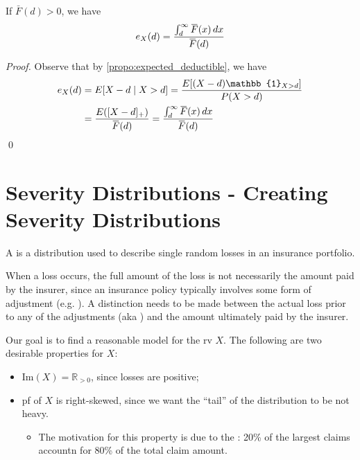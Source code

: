 \documentclass[notoc,notitlepage]{tufte-book}
\begin{document}
\begin{propo}
\label{propo:an_expression_for_mean_excess_value}
  If $\bar{F}(d) > 0$, we have
  \begin{equation*}
    e_X(d) = \frac{\int_{d}^{\infty} \bar{F}(x) \dif{x}}{\bar{F}(d)}
  \end{equation*}
\end{propo}

\begin{proof}
  Observe that by \cref{propo:expected_deductible}, we have
  \begin{align*}
    e_X(d) &= E[ X - d \mid X > d ] = \frac{E[ ( X - d ) \mathbb{1}_{X > d} ]}{P(X > d)} \\
           &= \frac{E( [ X - d ]_+ )}{\bar{F}(d)} = \frac{\int_{d}^{\infty} \bar{F}(x) \dif{x}}{\bar{F}(d)}
  \end{align*}\qed
\end{proof}



\section{Severity Distributions - Creating Severity Distributions}%
\label{sec:severity_distributions_creating_severity_distributions}

\begin{defn}
\label{defn:severity_distribution}
  A  is a distribution used to describe single random losses in an insurance portfolio.
\end{defn}

When a loss occurs, the full amount of the loss is not necessarily the amount paid by the insurer, since an insurance policy typically involves some form of adjustment (e.g. ). A distinction needs to be made between the actual loss prior to any of the adjustments (aka ) and the amount ultimately paid by the insurer.

Our goal is to find a reasonable model for the  rv $X$. The following are two desirable properties for $X$:
\begin{itemize}
  \item $\text{Im}(X) = \mathbb{R}_{> 0}$, since losses are positive;
  \item pf of $X$ is right-skewed, since we want the ``tail'' of the distribution to be not heavy.
    \begin{itemize}
      \item The motivation for this property is due to the : 20\% of the largest claims accountn for 80\% of the total claim amount.
    \end{itemize}
\end{itemize}
\end{document}
